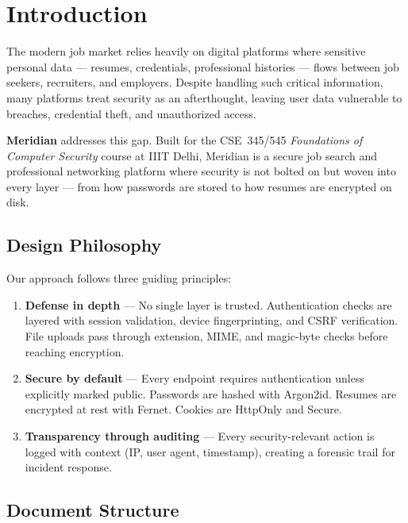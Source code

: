
\section{Introduction}

The modern job market relies heavily on digital platforms where sensitive personal data — resumes, credentials, professional histories — flows between job seekers, recruiters, and employers. Despite handling such critical information, many platforms treat security as an afterthought, leaving user data vulnerable to breaches, credential theft, and unauthorized access.

\textbf{Meridian} addresses this gap. Built for the CSE~345/545 \textit{Foundations of Computer Security} course at IIIT Delhi, Meridian is a secure job search and professional networking platform where security is not bolted on but woven into every layer — from how passwords are stored to how resumes are encrypted on disk.

\subsection{Design Philosophy}

Our approach follows three guiding principles:

\begin{enumerate}[label=\textbf{\arabic*.}]
    \item \textbf{Defense in depth} — No single layer is trusted. Authentication checks are layered with session validation, device fingerprinting, and CSRF verification. File uploads pass through extension, MIME, and magic-byte checks before reaching encryption.
    \item \textbf{Secure by default} — Every endpoint requires authentication unless explicitly marked public. Passwords are hashed with Argon2id. Resumes are encrypted at rest with Fernet. Cookies are HttpOnly and Secure.
    \item \textbf{Transparency through auditing} — Every security-relevant action is logged with context (IP, user agent, timestamp), creating a forensic trail for incident response.
\end{enumerate}

\subsection{Document Structure}

